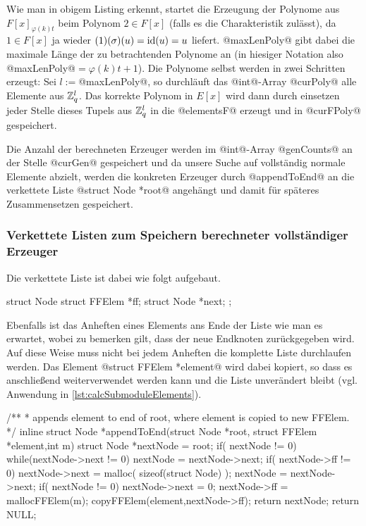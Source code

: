 Wie man in obigem Listing erkennt, startet die Erzeugung der Polynome aus 
$F[x]_{\varphi(k)t}$ beim Polynom $2 \in F[x]$ (falls es die Charakteristik
zulässt), da $1\in F[x]$ ja wieder $(1)(\sigma)(u) = \operatorname{id}(u) = u$ liefert.
@maxLenPoly@ gibt dabei die maximale Länge der zu betrachtenden Polynome an (in
hiesiger Notation also @maxLenPoly@$= \varphi(k)t+1$). Die Polynome selbst
werden in zwei Schritten erzeugt: Sei $l := $@maxLenPoly@, so
durchläuft das @int@-Array @curPoly@ alle Elemente aus $\mathbb{Z}_q^l$. 
Das korrekte Polynom in $E[x]$ wird dann durch einsetzen jeder Stelle 
dieses Tupels aus $\mathbb{Z}_q^l$ in die @elementsF@ erzeugt und in 
@curFPoly@ gespeichert.

Die Anzahl der berechneten Erzeuger werden im @int@-Array @genCounts@ an der
Stelle @curGen@ gespeichert und da unsere Suche auf vollständig normale
Elemente abzielt, werden die konkreten Erzeuger durch @appendToEnd@ 
an die verkettete Liste @struct Node *root@ angehängt und 
damit für späteres Zusammensetzen gespeichert.


\subsubsection{Verkettete Listen zum Speichern berechneter vollständiger 
Erzeuger}
\label{subsub:verkettete_listen}

Die verkettete Liste ist dabei wie folgt aufgebaut.

\begin{ccode}[caption={Aus \url{../Sage/enumeratePCNs.c}},
  firstnumber=175, label=lst:structNode]
struct Node {
    struct FFElem *ff;
    struct Node *next;
};
\end{ccode}

Ebenfalls ist das Anheften eines Elements ans Ende der Liste wie man es
erwartet, wobei zu bemerken gilt, dass der neue Endknoten zurückgegeben wird.
Auf diese Weise muss nicht bei jedem Anheften die komplette Liste durchlaufen
werden. Das Element @struct FFElem *element@ wird dabei kopiert, so dass es
anschließend weiterverwendet werden kann und die Liste unverändert bleibt 
(vgl. Anwendung in \autoref{lst:calcSubmoduleElements}).

\begin{ccode}[caption={Aus \url{../Sage/enumeratePCNs.c}},
  firstnumber=180, label=lst:appendToEnd]
/**
 * appends element to end of root, where element is copied to new FFElem.
 */
inline struct Node *appendToEnd(struct Node *root, struct FFElem *element,int m){
    struct Node *nextNode = root;
    if( nextNode != 0){
        while(nextNode->next != 0){
            nextNode = nextNode->next;
        }
        if( nextNode->ff != 0){
            nextNode->next = malloc( sizeof(struct Node) );
            nextNode = nextNode->next;
        }
        if( nextNode != 0){
            nextNode->next = 0;
            nextNode->ff = mallocFFElem(m);
            copyFFElem(element,nextNode->ff);
            return nextNode;
        }
    }
    return NULL;
}
\end{ccode}


